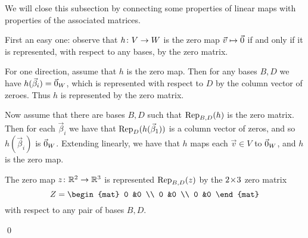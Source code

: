\documentclass[10pt,t]{beamer}
\begin{document}
\begin{frame}
We will close this subsection by connecting some properties of linear maps
with properties of the associated matrices.

First an easy one: 
observe that $\map{h}{V}{W}$ is the zero map $\vec{v}\mapsto\zero$
if and only
if it is represented, with respect to any bases, by the zero matrix.

\pause
For one direction, assume that $h$ is the zero map.
Then for any bases $B,D$ we have $h(\vec{\beta}_i)=\zero_W$, which is 
represented with respect to $D$ by the column vector of zeroes.
Thus $h$ is represented by the zero matrix.

\pause
Now assume that there are bases $B,D$ such that $\rep{h}{B,D}$ is the zero
matrix.
Then for each $\vec{\beta}_i$ we have that $\rep{h(\vec{\beta}_1)}{D}$ is a
column vector of zeros, and so $h(\vec{\beta}_i)$ is $\zero_W$.
Extending linearly, we have that $h$ maps each $\vec{v}\in V$ to $\zero_W$,
and $h$ is the zero map.  

\pause
\ex The zero map $\map{z}{\Re^2}{\Re^3}$ is represented 
$\rep{z}{B,D}$ by the $\nbym{2}{3}$
zero matrix
\begin{equation*}
  Z=
  \begin{mat}
    0 &0 \\
    0 &0 \\
    0 &0
  \end{mat}
\end{equation*}
with respect to any pair of bases $B,D$.

\end{frame}




\begin{frame}
\th[th:RankMatEqRankMap]
\pause
\pf
{}

\pause
{}
\end{frame}
\begin{frame}
\qed
\end{frame}
\end{document}
